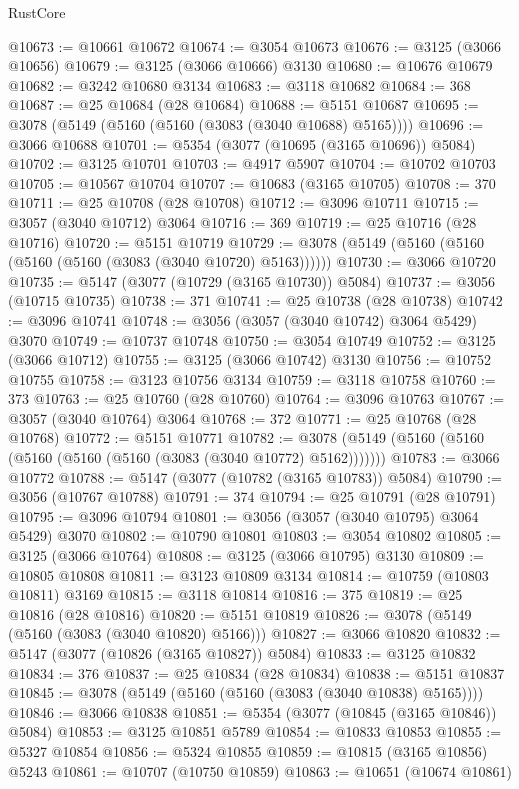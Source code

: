 \begin{lexlean}{RustCore}
\begin{coremodule}
@10673 := @10661 @10672
@10674 := @3054 @10673
@10676 := @3125 (@3066 @10656)
@10679 := @3125 (@3066 @10666) @3130
@10680 := @10676 @10679
@10682 := @3242 @10680 @3134
@10683 := @3118 @10682
@10684 := 368
@10687 := @25 @10684 (@28 @10684)
@10688 := @5151 @10687
@10695 := @3078 (@5149 (@5160 (@5160 (@3083 (@3040 @10688) @5165))))
@10696 := @3066 @10688
@10701 := @5354 (@3077 (@10695 (@3165 @10696)) @5084)
@10702 := @3125 @10701
@10703 := @4917 @5907
@10704 := @10702 @10703
@10705 := @10567 @10704
@10707 := @10683 (@3165 @10705)
@10708 := 370
@10711 := @25 @10708 (@28 @10708)
@10712 := @3096 @10711
@10715 := @3057 (@3040 @10712) @3064
@10716 := 369
@10719 := @25 @10716 (@28 @10716)
@10720 := @5151 @10719
@10729 := @3078 (@5149 (@5160 (@5160 (@5160 (@5160 (@3083 (@3040 @10720) @5163))))))
@10730 := @3066 @10720
@10735 := @5147 (@3077 (@10729 (@3165 @10730)) @5084)
@10737 := @3056 (@10715 @10735)
@10738 := 371
@10741 := @25 @10738 (@28 @10738)
@10742 := @3096 @10741
@10748 := @3056 (@3057 (@3040 @10742) @3064 @5429) @3070
@10749 := @10737 @10748
@10750 := @3054 @10749
@10752 := @3125 (@3066 @10712)
@10755 := @3125 (@3066 @10742) @3130
@10756 := @10752 @10755
@10758 := @3123 @10756 @3134
@10759 := @3118 @10758
@10760 := 373
@10763 := @25 @10760 (@28 @10760)
@10764 := @3096 @10763
@10767 := @3057 (@3040 @10764) @3064
@10768 := 372
@10771 := @25 @10768 (@28 @10768)
@10772 := @5151 @10771
@10782 := @3078 (@5149 (@5160 (@5160 (@5160 (@5160 (@5160 (@3083 (@3040 @10772) @5162)))))))
@10783 := @3066 @10772
@10788 := @5147 (@3077 (@10782 (@3165 @10783)) @5084)
@10790 := @3056 (@10767 @10788)
@10791 := 374
@10794 := @25 @10791 (@28 @10791)
@10795 := @3096 @10794
@10801 := @3056 (@3057 (@3040 @10795) @3064 @5429) @3070
@10802 := @10790 @10801
@10803 := @3054 @10802
@10805 := @3125 (@3066 @10764)
@10808 := @3125 (@3066 @10795) @3130
@10809 := @10805 @10808
@10811 := @3123 @10809 @3134
@10814 := @10759 (@10803 @10811) @3169
@10815 := @3118 @10814
@10816 := 375
@10819 := @25 @10816 (@28 @10816)
@10820 := @5151 @10819
@10826 := @3078 (@5149 (@5160 (@3083 (@3040 @10820) @5166)))
@10827 := @3066 @10820
@10832 := @5147 (@3077 (@10826 (@3165 @10827)) @5084)
@10833 := @3125 @10832
@10834 := 376
@10837 := @25 @10834 (@28 @10834)
@10838 := @5151 @10837
@10845 := @3078 (@5149 (@5160 (@5160 (@3083 (@3040 @10838) @5165))))
@10846 := @3066 @10838
@10851 := @5354 (@3077 (@10845 (@3165 @10846)) @5084)
@10853 := @3125 @10851 @5789
@10854 := @10833 @10853
@10855 := @5327 @10854
@10856 := @5324 @10855
@10859 := @10815 (@3165 @10856) @5243
@10861 := @10707 (@10750 @10859)
@10863 := @10651 (@10674 @10861)

\end{coremodule}
\end{lexlean}
